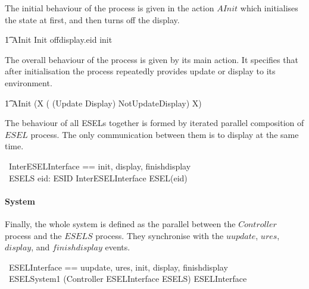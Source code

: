 The initial behaviour of the process is given in the action $AInit$ which initialises the state at first, and then turns off the display.
\begin{circusaction}
        \t1 AInit \circdef \lschexpract Init \rschexpract \circseq offdisplay.eid \then init \then \Skip\\
\end{circusaction}
The overall behaviour of the process is given by its main action. It specifies that after initialisation the process repeatedly provides update or display to its environment.
\begin{circusaction}
	    \t1 \circspot AInit \circseq (\circmu X \circspot ( (Update \circseq Display) \extchoice NotUpdateDisplay) \circseq X) \\
\end{circusaction}
\begin{circus}
	\circend
\end{circus}

The behaviour of all ESELs together is formed by iterated parallel composition of $ESEL$ process. The only communication between them is to display at the same time.
\begin{circus}
    \circchannelset\ InterESELInterface == \lchanset init, display, finishdisplay \rchanset \\
    \circprocess\ ESELS \circdef \Parallel eid: ESID \lpar InterESELInterface \rpar \circspot ESEL(eid)
\end{circus}

\paragraph{System}
Finally, the whole system is defined as the parallel between the $Controller$ process and the $ESELS$ process. They synchronise with the $uupdate$, $ures$, $display$, and $finishdisplay$ events.
\begin{circus}
    \circchannelset\ ESELInterface == \lchanset uupdate, ures, init, display, finishdisplay \rchanset \\
    \circprocess\ ESELSystem1 \circdef (Controller \lpar ESELInterface \rpar ESELS) \circhide ESELInterface
\end{circus}

